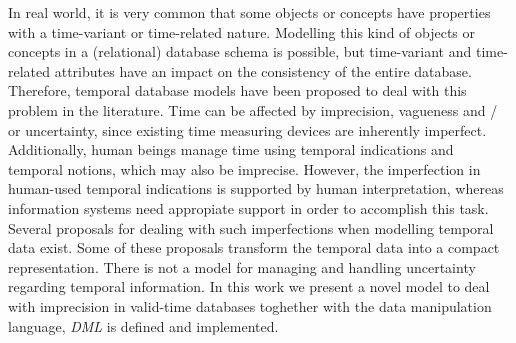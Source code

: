 %
%
In real world, it is very common that some objects or concepts have properties with a time-variant or time-related nature. Modelling this kind of objects or concepts in a (relational) database schema is possible, but time-variant and time-related attributes have an impact on the consistency of the entire database. Therefore, temporal database models have been proposed to deal with this problem in the literature. Time can be affected by imprecision, vagueness and / or  uncertainty, since existing time measuring devices are inherently imperfect. Additionally, human beings manage time using temporal indications and temporal notions, which may also be imprecise. However, the imperfection in human-used temporal indications is supported by human interpretation, whereas information systems need appropiate support in order to accomplish this task. Several proposals for dealing with such imperfections when modelling temporal data exist. Some of these proposals transform the temporal data into a compact representation. There is not a model for managing and handling uncertainty regarding temporal information.
In this work we present a novel model to deal with imprecision in valid-time databases toghether with the data manipulation language, \emph{DML} is defined and implemented.
